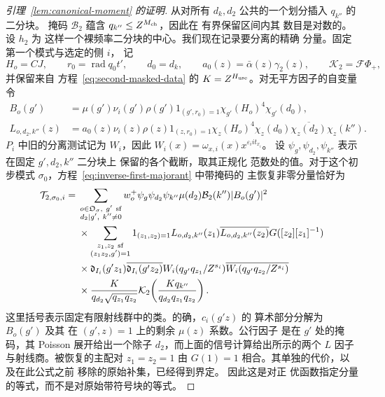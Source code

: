 \documentclass[11pt,a4paper]{article}
\numberwithin{equation}{section}
\numberwithin{figure}{section}
\theoremstyle{definition}
\theoremstyle{remark}
\begin{document}
\begin{proof}[引理~\ref{lem:canonical-moment} 的证明]
从对所有 \(d_k,d_2\) 公共的一个划分插入 \(q_{k''}\) 的二分块。
掩码 \(\mathcal B_2\) 蕴含 \(q_{k''}\le Z^{M_{\rm ch}}\)，因此在
有界保留区间内其
数目是对数的。设 \(h_2\) 为
这样一个裸频率二分块的中心。我们现在记录要分离的精确
分量。固定第一个模式与选定的侧 \(i\)，
记
\[
 H_o=CJ,\qquad r_0=\operatorname{rad}q_0t',\qquad d_0=d_k,
 \qquad a_0(z)=\bar\alpha(z)\gamma_2(z),\qquad
 \mathcal K_2=\mathcal F\Phi_+,
\]
并保留来自
方程~\eqref{eq:second-masked-data} 的 \(K=Z^{H_{\rm use}}\)。对无平方因子的自变量令
\begin{equation}\label{eq:inverse-second-outer-coefficients}
 \begin{split}
 B_o(g')&=\mu(g')\nu_i(g')\rho(g')1_{(g',r_0)=1}
              \chi_{g'}(H_o)^4\chi_{g'}(d_0),\\
 L_{o,d_2,k''}(z)&=a_0(z)\nu_i(z)\rho(z)1_{(z,r_0)=1}
       \chi_z(H_o)^4\chi_z(d_0)\overline{\chi_z(d_2)}\chi_z(k'').
 \end{split}
\end{equation}
\(P_i\) 中旧的分离测试记为 \(W_i\)，因此
\(W_i(x)=\omega_{x,i}(x)x^{\varepsilon_iit_{x_i}}\)。
设 \(\psi_g,\psi_{d_2},\psi_{k''}\) 表示在固定 \(g',d_2,k''\) 二分块上
保留的各个截断，取其正规化
范数处的值。对于这个初步模式 \(\sigma_0\)，方程~\eqref{eq:inverse-first-majorant}
中带掩码的
主恢复非零分量恰好为
\begin{equation}\label{eq:inverse-second-formal-component}
 \begin{split}
 \mathcal T_{2,\sigma_0,i}={}&
 \sum_{\substack{o\in\mathfrak O_\sigma,\ g'\ {\rm sf}\\
d_2\mid g',\ k''\ne0}}
 w_o^+\psi_g\psi_{d_2}\psi_{k''}\mu(d_2)\mathcal B_2(k'')|B_o(g')|^2\\
 &\times\sum_{\substack{z_1,z_2\ {\rm sf}\\
(z_1z_2,g')=1}}
 1_{(z_1,z_2)=1}L_{o,d_2,k''}(z_1)\overline{L_{o,d_2,k''}(z_2)}
       G([z_2][z_1]^{-1})\\
 &\times\mathfrak d_{I_i}(g'z_1)\overline{\mathfrak d_{I_i}(g'z_2)}
       W_i(q_{g'}q_{z_1}/Z^{s_i})
       \overline{W_i(q_{g'}q_{z_2}/Z^{s_i})}\\
 &\times\frac{K}{q_{d_2}\sqrt{q_{z_1}q_{z_2}}}
       \mathcal K_2\!\left(\frac{Kq_{k''}}{q_{d_2}q_{z_1}q_{z_2}}\right).
 \end{split}
\end{equation}
这里括号表示固定有限射线群中的类。的确，\(c_i(g'z)\) 的
算术部分分解为 \(B_o(g')\) 及其
在 \((g',z)=1\) 上的剩余 \(\mu(z)\) 系数。公行因子
是在 \(g'\) 处的掩码，其 Poisson 展开给出一个除子
\(d_2\)，而上面的信号计算给出所示的两个
\(L\) 因子与射线商。被恢复的主配对
\(z_1=z_2=1\) 由 \(G(1)=1\) 相合。其单独的代价，以及在此公式之前
移除的原始补集，已经得到界定。
因此这是对正
优函数指定分量的等式，而不是对原始带符号块的等式。


\end{proof}
\end{document}
